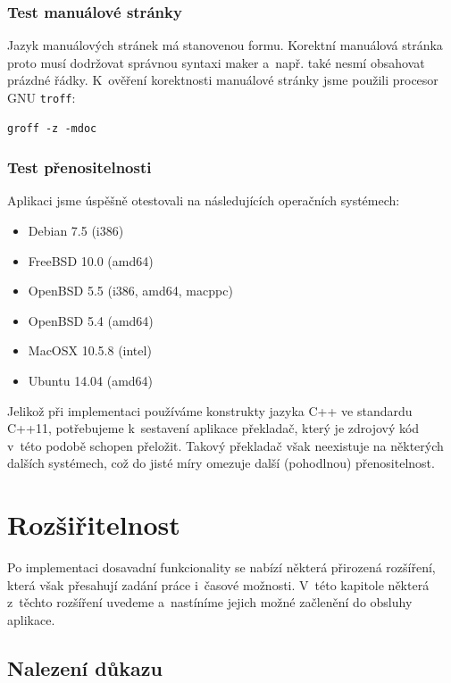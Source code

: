 \documentclass[thesis=B,czech,hidelinks]{thesis}[2012/06/26]
\begin{document}
\subsection{Test manuálové stránky}

Jazyk manuálových stránek má stanovenou formu. Korektní manuálová stránka proto musí dodržovat správnou syntaxi maker a~např. také nesmí obsahovat prázdné řádky. K~ověření korektnosti manuálové stránky jsme použili procesor GNU \texttt{troff}:

\begin{lstlisting}
groff -z -mdoc
\end{lstlisting}

\subsection{Test přenositelnosti}

Aplikaci jsme úspěšně otestovali na následujících operačních systémech:

\begin{itemize}
	\item Debian 7.5 (i386)
	\item FreeBSD 10.0 (amd64)
	\item OpenBSD 5.5 (i386, amd64, macppc)
	\item OpenBSD 5.4 (amd64)
	\item MacOSX 10.5.8 (intel)
	\item Ubuntu 14.04 (amd64)
\end{itemize}

Jelikož při implementaci používáme konstrukty jazyka C++ ve standardu C++11, potřebujeme k~sestavení aplikace překladač, který je zdrojový kód v~této podobě schopen přeložit. Takový překladač však neexistuje na některých dalších systémech, což do jisté míry omezuje další (pohodlnou) přenositelnost.

%
%
%

\chapter{Rozšiřitelnost}

Po implementaci dosavadní funkcionality se nabízí některá přirozená rozšíření, která však přesahují zadání práce i~časové možnosti. V~této kapitole některá z~těchto rozšíření uvedeme a~nastíníme jejich možné začlenění do obsluhy aplikace.

\section{Nalezení důkazu}
\end{document}
